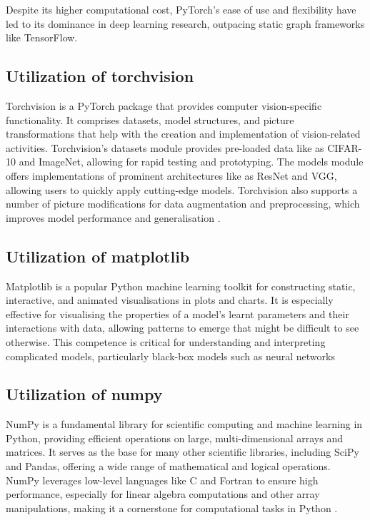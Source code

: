 \documentclass[conference]{IEEEtran}
\begin{document}
Despite its higher computational cost, PyTorch's ease of use and flexibility have led to its dominance in deep learning research, outpacing static graph frameworks like TensorFlow.

\subsection{Utilization of torchvision}
Torchvision is a PyTorch package that provides computer vision-specific functionality. It comprises datasets, model structures, and picture transformations that help with the creation and implementation of vision-related activities. Torchvision's datasets module provides pre-loaded data like as CIFAR-10 and ImageNet, allowing for rapid testing and prototyping. The models module offers implementations of prominent architectures like as ResNet and VGG, allowing users to quickly apply cutting-edge models. Torchvision also supports a number of picture modifications for data augmentation and preprocessing, which improves model performance and generalisation \cite{b9}.

\subsection{Utilization of matplotlib}
Matplotlib is a popular Python machine learning toolkit for constructing static, interactive, and animated visualisations in plots and charts. It is especially effective for visualising the properties of a model's learnt parameters and their interactions with data, allowing patterns to emerge that might be difficult to see otherwise. This competence is critical for understanding and interpreting complicated models, particularly black-box models such as neural networks \cite{b9}

\subsection{Utilization of numpy}
NumPy is a fundamental library for scientific computing and machine learning in Python, providing efficient operations on large, multi-dimensional arrays and matrices. It serves as the base for many other scientific libraries, including SciPy and Pandas, offering a wide range of mathematical and logical operations. NumPy leverages low-level languages like C and Fortran to ensure high performance, especially for linear algebra computations and other array manipulations, making it a cornerstone for computational tasks in Python \cite{b9}.
\end{document}
